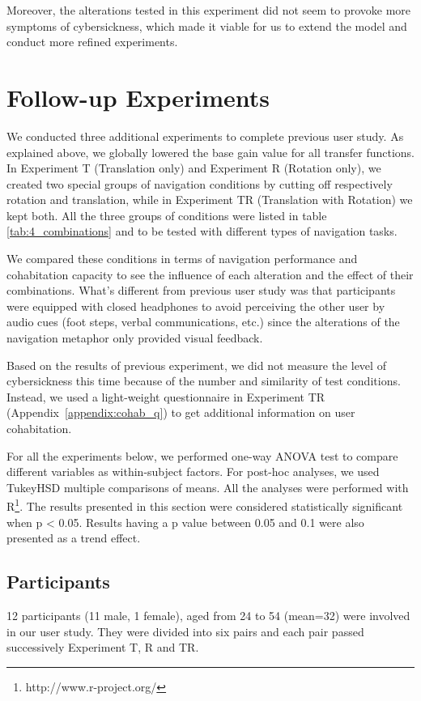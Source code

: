 Moreover, the alterations tested in this experiment did not seem to provoke more symptoms of cybersickness, which made it viable for us to extend the model and conduct more refined experiments.




\section{Follow-up Experiments}
\label{sec:follow_exp}
We conducted three additional experiments to complete previous user study. As explained above, we globally lowered the base gain value for all transfer functions. In Experiment T (Translation only) and Experiment R (Rotation only), we created two special groups of navigation conditions by cutting off respectively rotation and translation, while in Experiment TR (Translation with Rotation) we kept both. All the three groups of conditions were listed in table \ref{tab:4_combinations} and to be tested with different types of navigation tasks. 

We compared these conditions in terms of navigation performance and cohabitation capacity to see the influence of each alteration and the effect of their combinations. What's different from previous user study was that participants were equipped with closed headphones to avoid perceiving the other user by audio cues (foot steps, verbal communications, etc.) since the alterations of the navigation metaphor only provided visual feedback.

Based on the results of previous experiment, we did not measure the level of cybersickness this time because of the number and similarity of test conditions. Instead, we used a light-weight questionnaire in Experiment TR (Appendix~\ref{appendix:cohab_q}) to get additional information on user cohabitation.

For all the experiments below, we performed one-way ANOVA test to compare different variables as within-subject factors. For post-hoc analyses, we used TukeyHSD multiple comparisons of means. All the analyses were performed with R\footnote{http://www.r-project.org/}. The results presented in this section were considered statistically significant when p \textless{} 0.05. Results having a p value between 0.05 and 0.1 were also presented as a trend effect.

\subsection{Participants}
12 participants (11 male, 1 female), aged from 24 to 54 (mean=32) were involved in our user study. They were divided into six pairs and each pair passed successively Experiment T, R and TR.



